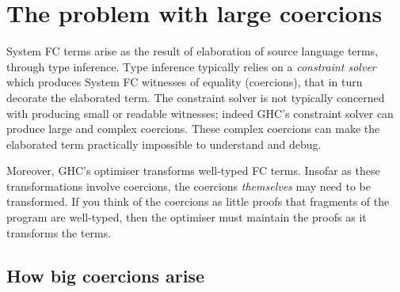 \documentclass[a4paper,UKenglish]{lipics}
\newcommand{\psim}{\mathrel{\sim_{\tiny \#}}}
\newcommand{\ol}[1]{\overline{#1}}
\newcommand{\lifting}[2]{[#1]{\uparrow}(#2)}
\newcommand{\nth}[2]{\mathop{nth} #1\;#2}
\newcommand{\tcast}[2]{#1\;\triangleright\;#2}
\newcommand{\as}{\ol{a}}
\newcommand{\cs}{\ol{c}}
\newcommand{\deltas}{\ol{\delta}}
\newcommand{\phis}{\ol{\phi}}
\newcommand{\sigmas}{\ol{\sigma}}
\begin{document}


\section{The problem with large coercions}\label{ssect:large}

System FC terms arise as the result of elaboration of source language
terms, through type inference. Type inference typically
relies on a \emph{constraint solver} \cite{pjv:modular}
which produces System FC witnesses of
equality (coercions), that in turn decorate the elaborated term. The constraint solver is
not typically concerned with producing small or readable witnesses;
indeed GHC's constraint solver can produce large and complex coercions.
These complex coercions can make the
elaborated term practically impossible to understand and debug.

Moreover, GHC's optimiser transforms well-typed FC terms.
Insofar as these transformations involve coercions, the coercions \emph{themselves}
may need to be transformed.  If you think of the coercions as little proofs that
fragments of the program are well-typed, then the optimiser must maintain the proofs
as it transforms the terms.  

\subsection{How big coercions arise}
\end{document}
